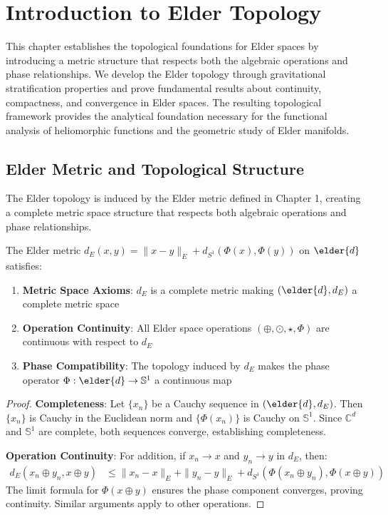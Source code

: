 \chapter{Introduction to Elder Topology}

\begin{tcolorbox}[colback=DarkSkyBlue!5!white,colframe=DarkSkyBlue!75!black,title=Chapter Summary]
This chapter establishes the topological foundations for Elder spaces by introducing a metric structure that respects both the algebraic operations and phase relationships. We develop the Elder topology through gravitational stratification properties and prove fundamental results about continuity, compactness, and convergence in Elder spaces. The resulting topological framework provides the analytical foundation necessary for the functional analysis of heliomorphic functions and the geometric study of Elder manifolds.
\end{tcolorbox}

\section{Elder Metric and Topological Structure}

The Elder topology is induced by the Elder metric defined in Chapter 1, creating a complete metric space structure that respects both algebraic operations and phase relationships.

\begin{theorem}
The Elder metric $d_E(x,y) = \|x - y\|_E + d_{S^1}(\Phi(x), \Phi(y))$ on $\elder{d}$ satisfies:
\begin{enumerate}
    \item \textbf{Metric Space Axioms}: $d_E$ is a complete metric making $(\elder{d}, d_E)$ a complete metric space
    \item \textbf{Operation Continuity}: All Elder space operations $(\oplus, \odot, \star, \Phi)$ are continuous with respect to $d_E$
    \item \textbf{Phase Compatibility}: The topology induced by $d_E$ makes the phase operator $\Phi: \elder{d} \to \mathbb{S}^1$ a continuous map
\end{enumerate}
\end{theorem}

\begin{proof}
\textbf{Completeness}: Let $\{x_n\}$ be a Cauchy sequence in $(\elder{d}, d_E)$. Then $\{x_n\}$ is Cauchy in the Euclidean norm and $\{\Phi(x_n)\}$ is Cauchy on $\mathbb{S}^1$. Since $\mathbb{C}^d$ and $\mathbb{S}^1$ are complete, both sequences converge, establishing completeness.

\textbf{Operation Continuity}: For addition, if $x_n \to x$ and $y_n \to y$ in $d_E$, then:
\begin{align}
d_E(x_n \oplus y_n, x \oplus y) &\leq \|x_n - x\|_E + \|y_n - y\|_E + d_{S^1}(\Phi(x_n \oplus y_n), \Phi(x \oplus y))
\end{align}
The limit formula for $\Phi(x \oplus y)$ ensures the phase component converges, proving continuity. Similar arguments apply to other operations.
\end{proof}

